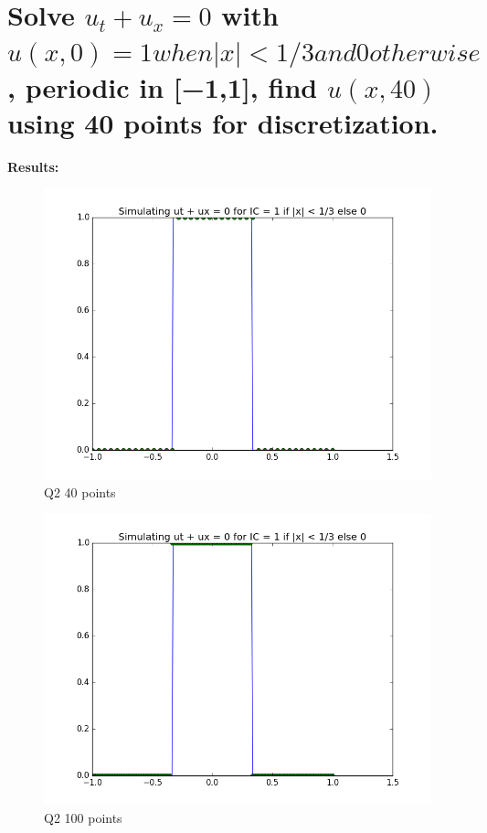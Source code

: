 \documentclass[a4paper,11pt]{article}
\begin{document}
\section{Solve $u_t+u_x=0$ with $u(x,0)= 1 when  |x|<1/3 and 0 otherwise$, periodic in [−1,1], find $u(x,40)$ using 40 points for discretization.\\}

\textbf{Results:}\\

\begin{figure}[ht]
    \centering
    \includegraphics[width=.8\linewidth]{q2_40.png}
    \caption{Q2 40 points}
    \label{fig:ex3}    
\end{figure}

\begin{figure}[ht]
    \centering
    \includegraphics[width=.8\linewidth]{q2_100.png}
    \caption{Q2 100 points}
    \label{fig:ex4}    
\end{figure}
\newpage
\indent\\
\newpage
\indent\\
\end{document}
